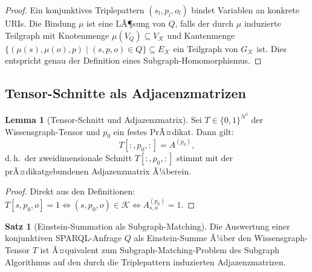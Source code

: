 ﻿\documentclass[a4paper,12pt]{article}
\theoremstyle{definition}
\newtheorem{satz}{Satz}
\newtheorem{lemma}{Lemma}
\begin{document}
\begin{proof}
Ein konjunktives Triplepattern $(s_l, p_l, o_l)$ bindet Variablen an konkrete URIs.
Die Bindung $\mu$ ist eine LÃ¶sung von $Q$, falls der durch $\mu$ induzierte Teilgraph
mit Knotenmenge $\mu(V_Q) \subseteq V_{\mathcal{K}}$ und Kantenmenge
$\{(\mu(s), \mu(o), p) \mid (s,p,o) \in Q\} \subseteq E_{\mathcal{K}}$ ein Teilgraph
von $G_{\mathcal{K}}$ ist. Dies entspricht genau der Definition eines
Subgraph-Homomorphismus.
\end{proof}

\subsection{Tensor-Schnitte als Adjacenzmatrizen}

\begin{lemma}[Tensor-Schnitt und Adjazenzmatrix]
\label{lem:tensor_adj}
Sei $T \in \{0,1\}^{N^3}$ der Wissensgraph-Tensor und $p_0$ ein festes PrÃ¤dikat.
Dann gilt:
\[
  T[:,p_0,:] = A^{(p_0)},
\]
d.\,h.\ der zweidimensionale Schnitt $T[:,p_0,:]$ stimmt mit der prÃ¤dikatgebundenen
Adjazenzmatrix Ã¼berein.
\end{lemma}

\begin{proof}
Direkt aus den Definitionen: $T[s,p_0,o] = 1 \Leftrightarrow (s,p_0,o) \in \mathcal{K}
\Leftrightarrow A^{(p_0)}_{s,o} = 1$.
\end{proof}

\begin{satz}[Einstein-Summation als Subgraph-Matching]
\label{satz:einstein_subgraph}
Die Auswertung einer konjunktiven SPARQL-Anfrage $Q$ als Einstein-Summe Ã¼ber den
Wissensgraph-Tensor $T$ ist Ã¤quivalent zum Subgraph-Matching-Problem des
Subgraph Algorithmus auf den durch die Triplepattern induzierten Adjazenzmatrizen.
\end{satz}
\end{document}
